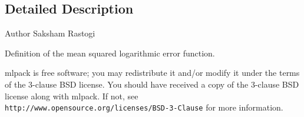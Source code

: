 \subsection{Detailed Description}
\begin{DoxyAuthor}{Author}
Saksham Rastogi
\end{DoxyAuthor}
Definition of the mean squared logarithmic error function.

mlpack is free software; you may redistribute it and/or modify it under the terms of the 3-\/clause B\+SD license. You should have received a copy of the 3-\/clause B\+SD license along with mlpack. If not, see {\tt http\+://www.\+opensource.\+org/licenses/\+B\+S\+D-\/3-\/\+Clause} for more information. 